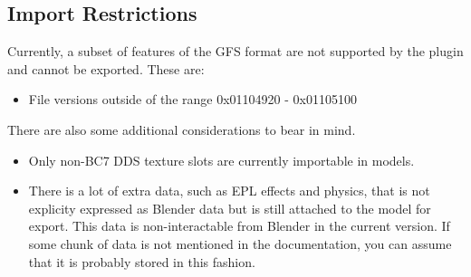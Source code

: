 \documentclass{article}
\begin{document}
\subsection{Import Restrictions}
Currently, a subset of features of the GFS format are not supported by the plugin and cannot be exported. These are:
\begin{itemize}
\item File versions outside of the range 0x01104920 - 0x01105100
\end{itemize}
\noindent
There are also some additional considerations to bear in mind.
\begin{itemize}
\item Only non-BC7 DDS texture slots are currently importable in models.
\item There is a lot of extra data, such as EPL effects and physics, that is not explicity expressed as Blender data but is still attached to the model for export. This data is non-interactable from Blender in the current version. If some chunk of data is not mentioned in the documentation, you can assume that it is probably stored in this fashion.
\end{itemize}

\clearpage 
\end{document}
